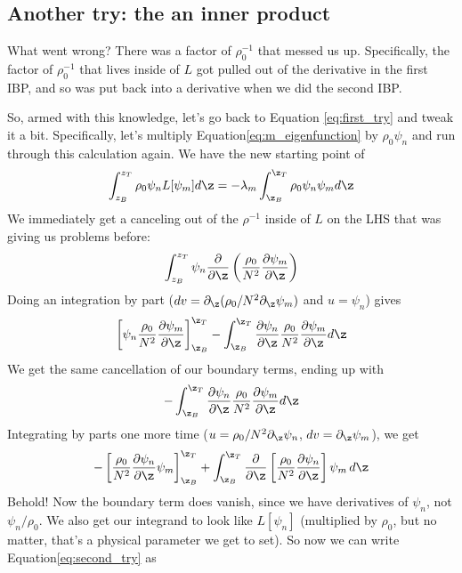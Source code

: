 \subsection{Another try: the an inner product}
What went wrong? There was a factor of $\rho_0^{-1}$ that messed us up. Specifically, the factor of $\rho_0^{-1}$ that lives inside of $L$ got pulled out of the derivative in the first IBP, and so was put back into a derivative when we did the second IBP. 
\par So, armed with this knowledge, let's go back to Equation \ref{eq:first_try} and tweak it a bit. Specifically, let's multiply Equation\ref{eq:m_eigenfunction} by $\rho_0\psi_n$ and run through this calculation again. We have the new starting point of 
\begin{equation}
  \label{eq:second_try}
  \int_{z_B}^{z_T}\rho_0\psi_nL[\psi_m]d\z=-\lambda_m\int_{\z_B}^{\z_T}\rho_0\psi_n\psi_m d\z
\end{equation}
We immediately get a canceling out of the $\rho^{-1}$ inside of $L$ on the LHS that was giving us problems before:
\begin{equation}
  \int_{z_B}^{z_T}\psi_n\frac{\partial}{\partial\z}\left(\frac{\rho_0}{N^2}\frac{\partial\psi_m}{\partial\z}\right)
\end{equation}
Doing an integration by part ($dv=\partial_{\z}(\rho_0/N^2\partial_{\z} \psi_m)$ and $u=\psi_n$) gives
\begin{equation}
    \left[\psi_n\frac{\rho_0}{N^2}\frac{\partial\psi_m}{\partial\z}\right]_{\z_B}^{\z_T}-\int_{\z_B}^{\z_T}\frac{\partial\psi_n}{\partial\z}\frac{\rho_0}{N^2}\frac{\partial\psi_m}{\partial\z}d\z
\end{equation}
We get the same cancellation of our boundary terms, ending up with 
\begin{equation}
  -\int_{\z_B}^{\z_T}\frac{\partial\psi_n}{\partial\z}\frac{\rho_0}{N^2}\frac{\partial\psi_m}{\partial\z}d\z
\end{equation}
Integrating by parts one more time ($u=\rho_0/N^2\partial_{\z}\psi_n$, $dv=\partial_{\z}\psi_m$), we get
\begin{equation}
 -\left[\frac{\rho_0}{N^2}\frac{\partial\psi_n}{\partial\z}\psi_m\right]_{\z_B}^{\z_T} + \int_{\z_B}^{\z_T}\frac{\partial}{\partial \z}\left[\frac{\rho_0}{N^2}\frac{\partial\psi_n}{\partial\z}\right]\psi_m\,d\z
\end{equation}
Behold! Now the boundary term does vanish, since we have derivatives of $\psi_n$, not $\psi_n/\rho_0$. We also get our integrand to look like $L[\psi_n]$ (multiplied by $\rho_0$, but no matter, that's a physical parameter we get to set). So now we can write Equation\ref{eq:second_try} as
